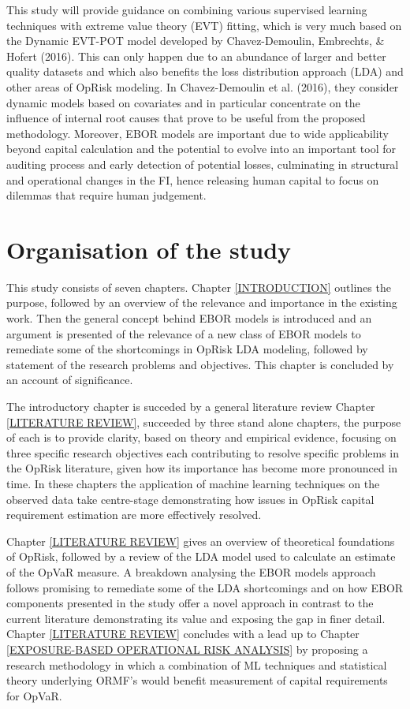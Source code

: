 \documentclass{DissertateUSU}
\begin{document}
This study will provide guidance on combining various supervised
learning techniques with extreme value theory (EVT) fitting, which is
very much based on the Dynamic EVT-POT model developed by
Chavez-Demoulin, Embrechts, \& Hofert (2016). This can only happen due
to an abundance of larger and better quality datasets and which also
benefits the loss distribution approach (LDA) and other areas of OpRisk
modeling. In Chavez-Demoulin et al. (2016), they consider dynamic models
based on covariates and in particular concentrate on the influence of
internal root causes that prove to be useful from the proposed
methodology. Moreover, EBOR models are important due to wide
applicability beyond capital calculation and the potential to evolve
into an important tool for auditing process and early detection of
potential losses, culminating in structural and operational changes in
the FI, hence releasing human capital to focus on dilemmas that require
human judgement.

\section{Organisation of the study}
\label{sec:Organisation of the study}

This study consists of seven chapters. Chapter \ref{INTRODUCTION}
outlines the purpose, followed by an overview of the relevance and
importance in the existing work. Then the general concept behind EBOR
models is introduced and an argument is presented of the relevance of a
new class of EBOR models to remediate some of the shortcomings in OpRisk
LDA modeling, followed by statement of the research problems and
objectives. This chapter is concluded by an account of
significance.\medskip

The introductory chapter is succeded by a general literature review
Chapter \ref{LITERATURE REVIEW}, succeeded by three stand alone
chapters, the purpose of each is to provide clarity, based on theory and
empirical evidence, focusing on three specific research objectives each
contributing to resolve specific problems in the OpRisk literature,
given how its importance has become more pronounced in time. In these
chapters the application of machine learning techniques on the observed
data take centre-stage demonstrating how issues in OpRisk capital
requirement estimation are more effectively resolved.\medskip

Chapter \ref{LITERATURE REVIEW} gives an overview of theoretical
foundations of OpRisk, followed by a review of the LDA model used to
calculate an estimate of the OpVaR measure. A breakdown analysing the
EBOR models approach follows promising to remediate some of the LDA
shortcomings and on how EBOR components presented in the study offer a
novel approach in contrast to the current literature demonstrating its
value and exposing the gap in finer detail. Chapter
\ref{LITERATURE REVIEW} concludes with a lead up to Chapter
\ref{EXPOSURE-BASED OPERATIONAL RISK ANALYSIS} by proposing a research
methodology in which a combination of ML techniques and statistical
theory underlying ORMF's would benefit measurement of capital
requirements for OpVaR.\medskip
\end{document}
